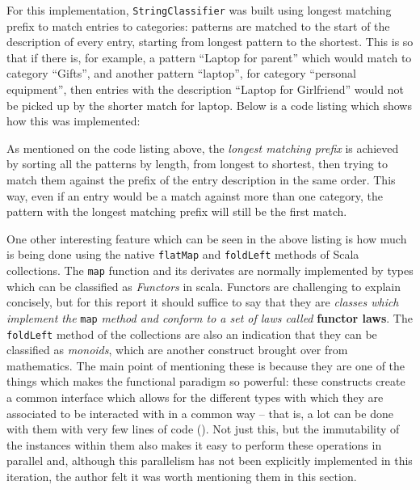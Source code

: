 For this implementation, \texttt{StringClassifier} was built using longest matching
prefix to match entries to categories: patterns are matched to the start of the
description of every entry, starting from longest pattern to the shortest. This
is so that if there is, for example, a pattern ``Laptop for parent'' which
would match to category ``Gifts'', and another pattern ``laptop'', for category
``personal equipment'', then entries with the description ``Laptop for
Girlfriend'' would not be picked up by the shorter match for laptop. Below is a
code listing which shows how this was implemented:
{
  \small
  
}

As mentioned on the code listing above, the \emph{longest matching prefix} is
achieved by sorting all the patterns by length, from longest to shortest, then
trying to match them against the prefix of the entry description in the same
order. This way, even if an entry would be a match against more than one
category, the pattern with the longest matching prefix will still be the first
match.

One other interesting feature which can be seen in the above listing is how
much is being done using the native \texttt{flatMap} and \texttt{foldLeft}
methods of Scala collections. The \texttt{map} function and its derivates are
normally implemented by types which can be classified as \emph{Functors} in
scala. Functors are challenging to explain concisely, but for this report it
should suffice to say that they are \emph{classes which implement the}
\texttt{map} \emph{method and conform to a set of laws called} \textbf{functor
laws}. The \texttt{foldLeft} method of the collections are also an indication
that they can be classified as \emph{monoids}, which are another construct
brought over from mathematics. The main point of mentioning these is because
they are one of the things which makes the functional paradigm so powerful:
these constructs create a common interface which allows for the different types
with which they are associated to be interacted with in a common way -- that
is, a lot can be done with them with very few lines of code
(\cite[][Ch.~1,~Location~4243~\&~703]{nikolov2016scala}). Not just this, but
the immutability of the instances within them also makes it easy to perform
these operations in parallel and, although this parallelism has not been
explicitly implemented in this iteration, the author felt it was worth
mentioning them in this section.

